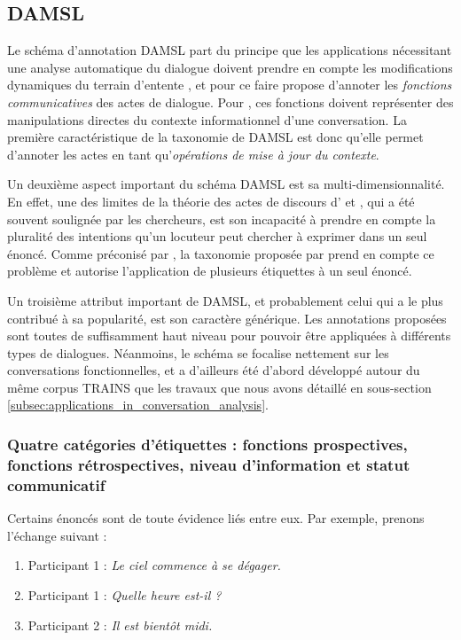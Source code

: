 \documentclass[10pt,a4paper,twoside]{article}
\begin{document}
\subsection{DAMSL}
\label{subsec:DAMSL}

Le schéma d'annotation DAMSL part du principe que les applications nécessitant une analyse automatique du dialogue doivent prendre en compte les modifications dynamiques du \og terrain d'entente \fg, et pour ce faire propose d'annoter les \textit{fonctions communicatives} des actes de dialogue. Pour \citet{core1997coding}, ces fonctions doivent représenter des manipulations directes du contexte informationnel d'une conversation. La première caractéristique de la taxonomie de DAMSL est donc qu'elle permet d'annoter les actes en tant qu'\textit{opérations de mise à jour du contexte}.

Un deuxième aspect important du schéma DAMSL est sa multi-dimensionnalité. En effet, une des limites de la théorie des actes de discours d'\citeauthor{austin1975how} et \citeauthor{searle1969speech}, qui a été souvent soulignée par les chercheurs, est son incapacité à prendre en compte la pluralité des intentions qu'un locuteur peut chercher à exprimer dans un seul énoncé. Comme préconisé par \citet{traum1992conversation}, la taxonomie proposée par \citeauthor{core1997coding} prend en compte ce problème et autorise l'application de plusieurs étiquettes à un seul énoncé.

Un troisième attribut important de DAMSL, et probablement celui qui a le plus contribué à sa popularité, est son caractère générique. Les annotations proposées sont toutes de suffisamment haut niveau pour pouvoir être appliquées à différents types de dialogues. Néanmoins, le schéma se focalise nettement sur les conversations fonctionnelles, et a d'ailleurs été d'abord développé autour du même corpus TRAINS que les travaux que nous avons détaillé en sous-section \ref{subsec:applications_in_conversation_analysis}.

\subsubsection{Quatre catégories d'étiquettes : fonctions prospectives, fonctions rétrospectives, niveau d'information et statut communicatif}

Certains énoncés sont de toute évidence liés entre eux. Par exemple, prenons l'échange suivant :

\begin{enumerate}
	\item Participant 1 : \og \textit{Le ciel commence à se dégager.} \fg
	\item Participant 1 : \og \textit{Quelle heure est-il ?} \fg
	\item Participant 2 : \og \textit{Il est bientôt midi.} \fg
\end{enumerate}
\end{document}
